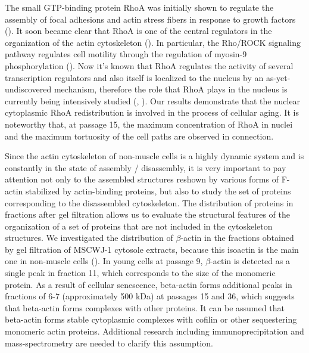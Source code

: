 \documentclass[alpha-refs]{wiley-article}
\begin{document}
The small GTP-binding protein RhoA was initially shown to regulate the assembly of focal adhesions and actin stress fibers in response to growth factors (\cite{ridley1992small}).
It soon became clear that RhoA is one of the central regulators in the organization of the actin cytoskeleton (\cite{burridge2004rho}).
In particular, the Rho/ROCK signaling pathway regulates cell motility through the regulation of myosin-9 phosphorylation (\cite{elliott2015myosin}).
Now it’s known that RhoA regulates the activity of several transcription regulators and also itself is localized to the nucleus by an as-yet-undiscovered mechanism, therefore the role that RhoA plays in the nucleus is currently being intensively studied (\cite{guilluy2011analysis}, \cite{kim2018regulation}).
Our results demonstrate that the nuclear cytoplasmic RhoA redistribution is involved in the process of cellular aging.
It is noteworthy that, at passage 15, the maximum concentration of RhoA in nuclei and the maximum tortuosity of the cell paths are observed in connection.

Since the actin cytoskeleton of non-muscle cells is a highly dynamic system and is constantly in the state of assembly / disassembly, it is very important to pay attention not only to the assembled structures reshown by various forms of F-actin stabilized by actin-binding proteins, but also to study the set of proteins corresponding to the disassembled cytoskeleton.
The distribution of proteins in fractions after gel filtration allows us to evaluate the structural features of the organization of a set of proteins that are not included in the cytoskeleton structures.
We investigated the distribution of $\beta$-actin in the fractions obtained by gel filtration of MSCWJ-1 cytosole extracts, because this isoactin is the main one in non-muscle cells (\cite{khaitlina2001functional}).
In young cells at passage 9, $\beta$-actin is detected as a single peak in fraction 11, which corresponds to the size of the monomeric protein.
As a result of cellular senescence, beta-actin forms additional peaks in fractions of 6-7 (approximately 500 kDa) at passages 15 and 36, which suggests that beta-actin forms complexes with other proteins.
It can be assumed that beta-actin forms stable cytoplasmic complexes with cofilin or other sequestering monomeric actin proteins.
Additional research including immunoprecipitation and mass-spectrometry are needed to clarify this assumption.
\end{document}
